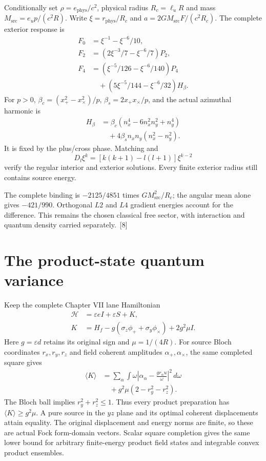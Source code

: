 \documentclass[10pt,twocolumn,letterpaper]{article}
\begin{document}
Conditionally set $\rho=e_{\mathrm{phys}}/c^2$, physical radius $R_c=\ell_uR$ and mass $M_{\mathrm{src}}=e_up/(c^2R)$. Write $\xi=r_{\mathrm{phys}}/R_c$ and $a=2GM_{\mathrm{src}}F/(c^2R_c)$. The complete exterior response is
\[
\begin{aligned}
F_0&=\xi^{-1}-\xi^{-6}/10,\\
F_2&=(2\xi^{-3}/7-\xi^{-6}/7)P_2,\\
F_4&=(\xi^{-5}/126-\xi^{-6}/140)P_4\\
&\quad +(5\xi^{-5}/144-\xi^{-6}/32)H_\beta.
\end{aligned}
\]
For $p>0$, $\beta_c=(x_+^2-x_\times^2)/p$, $\beta_s=2x_+x_\times/p$, and the actual azimuthal harmonic is
\[
\begin{aligned}
H_\beta&=\beta_c(n_x^4-6n_x^2n_y^2+n_y^4)\\
&\quad +4\beta_sn_xn_y(n_x^2-n_y^2).
\end{aligned}
\]
It is fixed by the plus/cross phase. Matching and
\[
D_l\xi^k=[k(k+1)-l(l+1)]\xi^{k-2}
\]
verify the regular interior and exterior solutions. Every finite exterior radius still contains source energy.

The complete binding is $-2125/4851$ times $GM_{\mathrm{src}}^2/R_c$; the angular mean alone gives $-421/990$. Orthogonal $L2$ and $L4$ gradient energies account for the difference. This remains the chosen classical free sector, with interaction and quantum density carried separately.~[8]

\section{The product-state quantum variance}
Keep the complete Chapter VII lane Hamiltonian
\[
\begin{aligned}
\mathcal H&=\varepsilon eI+\varepsilon S+K,\\
K&=H_f-g(\sigma_z\phi_++\sigma_y\phi_\times)+2g^2\mu I.
\end{aligned}
\]
Here $g=\varepsilon d$ retains its original sign and $\mu=1/(4R)$. For source Bloch coordinates $r_x,r_y,r_z$ and field coherent amplitudes $\alpha_+,\alpha_\times$, the same completed square gives
\[
\begin{aligned}
\langle K\rangle&=\sum_\alpha\int\omega\left|\alpha_\alpha-\frac{gr_\alpha u}{\omega}\right|^2\,d\omega\\
&\quad +g^2\mu(2-r_y^2-r_z^2).
\end{aligned}
\]
The Bloch ball implies $r_y^2+r_z^2\leq1$. Thus every product preparation has $\langle K\rangle\geq g^2\mu$. A pure source in the $yz$ plane and its optimal coherent displacements attain equality. The original displacement and energy norms are finite, so these are actual Fock form-domain vectors. Scalar square completion gives the same lower bound for arbitrary finite-energy product field states and integrable convex product ensembles.
\end{document}
